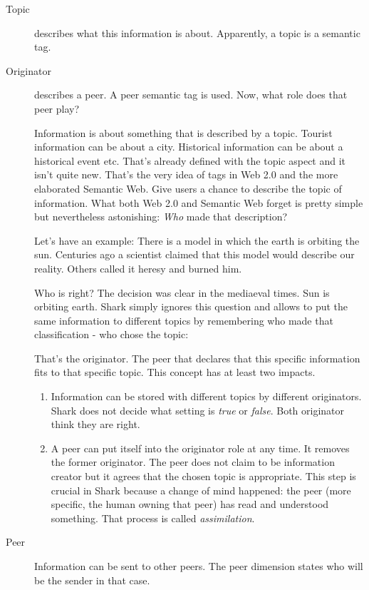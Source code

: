 \begin{description}
    \item[Topic] describes what this information is about. Apparently, a topic is a semantic tag. 
    \item[Originator] describes a peer. A peer semantic tag is used. Now, what role does that peer play? 

Information is about something that is described by a topic. Tourist information can be about a city. Historical information can be about a historical event etc. That's already defined with the topic aspect and it isn't quite new. That's the very idea of tags in Web 2.0 and the more elaborated Semantic Web. Give users a chance to describe the topic of information. What both Web 2.0 and Semantic Web forget is pretty simple but nevertheless astonishing:
{\it Who} made that description?

Let's have an example:
There is a model in which the earth is orbiting the sun. Centuries ago a scientist claimed that this model would describe our reality. Others called it heresy and burned him.  

Who is right? The decision was clear in the  mediaeval times. Sun is orbiting earth. Shark simply ignores this question and allows to put the same information to different topics by remembering who made that classification - who chose the topic:

That's the originator. The peer that declares that this specific information fits to that specific topic. This concept has at least two impacts.

\begin{enumerate}
\item 
Information can be stored with different topics by different originators. Shark does not decide what setting is {\it true} or {\it false}. Both originator think they are right.

\item 
A peer can put itself into the originator role at any time. It removes the former originator. The peer does not claim to be information creator but it agrees that the chosen topic is appropriate. This step is crucial in Shark because a change of mind happened: the peer (more specific, the human owning that peer) has read and understood something. That process is called {\it assimilation}.
\end{enumerate}

    \item[Peer] Information can be sent to other peers. The peer dimension states who will be the sender in that case.


\end{description}
